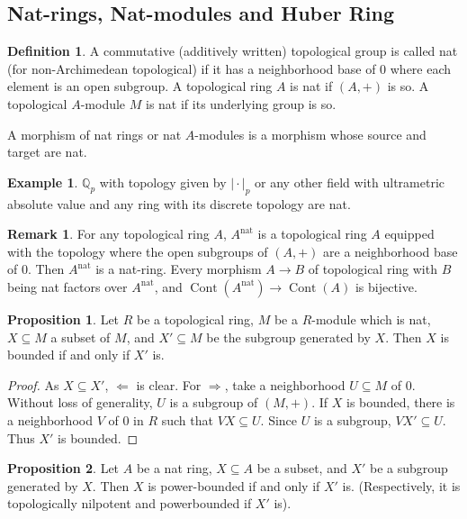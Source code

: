 \documentclass[10pt]{article}
\numberwithin{equation}{section}
\theoremstyle{definition}
\newtheorem{proposition}{Proposition}[subsection]
\newtheorem{definition}{Definition}[subsection]
\newtheorem{remark}{Remark}[subsection]
\newtheorem{example}{Example}[subsection]
\DeclareMathOperator{\Cont}{Cont}
\newcommand{\Q}[0]{\mathbb{Q}}
\newcommand{\ab}[1]{\vert #1 \vert}
\newcommand{\nat}[0]{\mathrm{nat}}
\begin{document}
\subsection{Nat-rings, Nat-modules and Huber Ring}

\begin{definition}
    A commutative (additively written) topological group is called nat (for non-Archimedean topological) if it has a neighborhood base of $0$ where each element is an open subgroup.
    A topological ring $A$ is nat if $(A,+)$ is so. A topological $A$-module $M$ is nat if its underlying group is so.
    \par A morphism of nat rings or nat $A$-modules is a morphism whose source and target are nat.
\end{definition}

\begin{example}
    $\Q_p$ with topology given by $\ab{\cdot}_p$ or any other field with ultrametric absolute value and any ring with its discrete topology are nat.
\end{example}
\begin{remark}
    For any topological ring $A$, $A^{\mathrm{nat}}$ is a topological ring $A$ equipped with the topology where the open subgroups of $(A,+)$ are a neighborhood base of $0$. Then $A^{\nat}$ is a nat-ring. Every morphism $A\to B$ of topological ring with $B$ being nat factors over $A^{\nat}$, and $\Cont(A^\nat)\to \Cont(A)$ is bijective.
\end{remark}

\begin{proposition}
    \label{fact_16_1}
    Let $R$ be a topological ring, $M$ be a $R$-module which is nat, $X\subseteq M$ a subset of $M$, and $X'\subseteq M$ be the subgroup generated by $X$. Then $X$ is bounded if and only if $X'$ is.
\end{proposition}
\begin{proof}
    As $X\subseteq X'$, $\Leftarrow$ is clear.
    For $\Rightarrow$, take a neighborhood $U\subseteq M$ of $0$. Without loss of generality, $U$ is a subgroup of $(M,+)$. If $X$ is bounded, there is a neighborhood $V$ of $0$ in $R$ such that $VX\subseteq U$. Since $U$ is a subgroup, $VX'\subseteq U$. Thus $X'$ is bounded.
\end{proof}

\begin{proposition}
    \label{fact_16_1_b}
    Let $A$ be a nat ring, $X\subseteq A$ be a subset, and $X'$ be a subgroup generated by $X$. Then $X$ is power-bounded if and only if $X'$ is. (Respectively, it is topologically nilpotent and powerbounded if $X'$ is).
\end{proposition}
\end{document}
